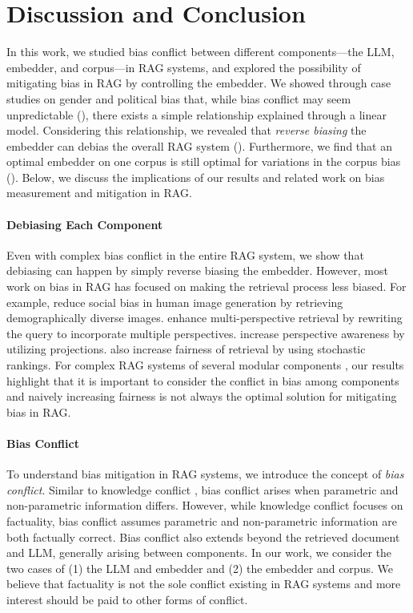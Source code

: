 \section{Discussion and Conclusion}
\label{discuss}
In this work, we studied bias conflict between different components---the LLM, embedder, and corpus---in RAG systems, and explored the possibility of mitigating bias in RAG by controlling the embedder. We showed through case studies on gender and political bias that, while bias conflict may seem unpredictable (), there exists a simple relationship explained through a linear model. Considering this relationship, we revealed that \emph{reverse biasing} the embedder can debias the overall RAG system (). Furthermore, we find that an optimal embedder on one corpus is still optimal for variations in the corpus bias (). Below, we discuss the implications of our results and related work on bias measurement and mitigation in RAG. 

\paragraph{Debiasing Each Component}
Even with complex bias conflict in the entire RAG system, we show that debiasing can happen by simply reverse biasing the embedder. However, most work on bias in RAG has focused on making the retrieval process less biased. For example, \citet{Shrestha_2024_CVPR} reduce social bias in human image generation by retrieving demographically diverse images. \citet{chen2024unlockingmultiviewinsightsknowledgedense} enhance multi-perspective retrieval by rewriting the query to incorporate multiple perspectives. \citet{zhao2024beyond} increase perspective awareness by utilizing projections. \citet{kim2024towards} also increase fairness of retrieval by using stochastic rankings. For complex RAG systems of several modular components \citep{gao2024modular}, our results highlight that it is important to consider the conflict in bias among components and naively increasing fairness is not always the optimal solution for mitigating bias in RAG.

\paragraph{Bias Conflict}
To understand bias mitigation in RAG systems, we introduce the concept of \emph{bias conflict}. Similar to knowledge conflict \citep{mallen2022not,chen2022rich,longpre2021entity,xie2023adaptive}, bias conflict arises when parametric and non-parametric information differs. However, while knowledge conflict focuses on factuality, bias conflict assumes parametric and non-parametric information are both factually correct. Bias conflict also extends beyond the retrieved document and LLM, generally arising between components. In our work, we consider the two cases of (1) the LLM and embedder and (2) the embedder and corpus. We believe that factuality is not the sole conflict existing in RAG systems and more interest should be paid to other forms of conflict.

